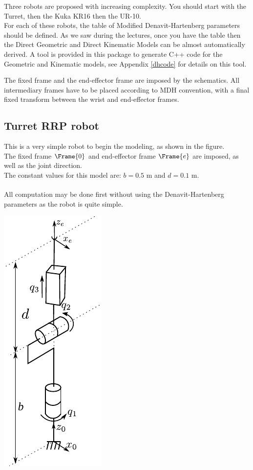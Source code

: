 \documentclass{ecnreport}
\begin{document}
  Three robots are proposed with increasing complexity. You should start with the Turret, then the Kuka KR16 then the UR-10.\\
  For each of these robots, the table of Modified Denavit-Hartenberg parameters should be defined. As we saw during the lectures, once you have the table then the Direct Geometric and Direct Kinematic Models can be almost automatically derived. A tool is provided in this package to generate C++ code for the Geometric and Kinematic models, see Appendix \ref{dhcode} for details on this tool.
  
  The fixed frame and the end-effector frame are imposed by the schematics. 
  All intermediary frames have to be placed according to MDH convention, with a final fixed transform between the wrist and end-effector frames.
  
  \subsection{Turret RRP robot}
  
  \begin{minipage}{.8\linewidth}
    This is a very simple robot to begin the modeling, as shown in the figure.\\
    The fixed frame $\Frame{0}$ and end-effector frame $\Frame{e}$ are imposed, as well as the joint direction.\\
    The constant values for this model are: $b = 0.5$ m and $d = 0.1$ m.\\~\\
    All computation may be done first without using the Denavit-Hartenberg parameters as the robot is quite simple. 
  \end{minipage}
  \begin{minipage}{.2\linewidth}
    \includegraphics{fig/turret}\label{turret}
  \end{minipage}
  
\end{document}

